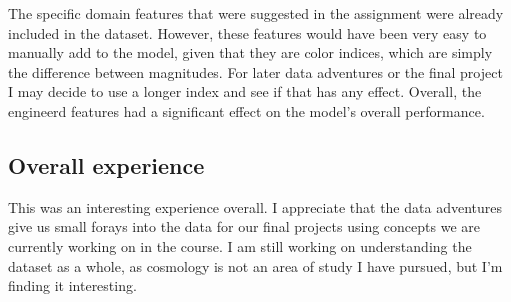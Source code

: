 \documentclass[11pt]{article}
\begin{document}
The specific domain features that were suggested in the assignment were
already included in the dataset. However, these features would have been
very easy to manually add to the model, given that they are color
indices, which are simply the difference between magnitudes. For later
data adventures or the final project I may decide to use a longer index
and see if that has any effect. Overall, the engineerd features had a
significant effect on the model's overall performance.

\hypertarget{overall-experience}{%
\subsection{Overall experience}\label{overall-experience}}

This was an interesting experience overall. I appreciate that the data
adventures give us small forays into the data for our final projects
using concepts we are currently working on in the course. I am still
working on understanding the dataset as a whole, as cosmology is not an
area of study I have pursued, but I'm finding it interesting.


    
    
    
\end{document}
